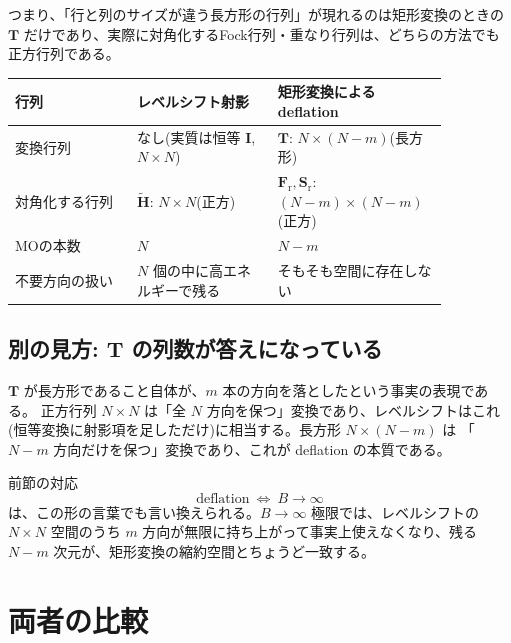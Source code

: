 \documentclass[uplatex,dvipdfmx,11pt]{jsarticle}
\newcommand{\Hcore}{\mathbf H}
\newcommand{\Tmat}{\mathbf T}
\newcommand{\Fr}{\mathbf F_{\mathrm r}}
\newcommand{\Sr}{\mathbf S_{\mathrm r}}
\begin{document}
つまり、「行と列のサイズが違う長方形の行列」が現れるのは矩形変換のときの
\(\Tmat\) だけであり、実際に対角化するFock行列・重なり行列は、どちらの方法でも
正方行列である。

\begin{center}
\begin{tabular}{|p{0.26\linewidth}|p{0.3\linewidth}|p{0.3\linewidth}|}
\hline
\textbf{行列} & \textbf{レベルシフト射影} & \textbf{矩形変換によるdeflation} \\
\hline
変換行列 & なし(実質は恒等 \(\mathbf I\), \(N\times N\)) &
\(\Tmat\): \(N\times(N-m)\)(長方形) \\
\hline
対角化する行列 & \(\widetilde{\Hcore}\): \(N\times N\)(正方) &
\(\Fr,\Sr\): \((N-m)\times(N-m)\)(正方) \\
\hline
MOの本数 & \(N\) & \(N-m\) \\
\hline
不要方向の扱い & \(N\) 個の中に高エネルギーで残る & そもそも空間に存在しない \\
\hline
\end{tabular}
\end{center}

\subsection{別の見方: \(\Tmat\) の列数が答えになっている}

\(\Tmat\) が長方形であること自体が、\(m\) 本の方向を落としたという事実の表現である。
正方行列 \(N\times N\) は「全 \(N\) 方向を保つ」変換であり、レベルシフトはこれ
(恒等変換に射影項を足しただけ)に相当する。長方形 \(N\times(N-m)\) は
「\(N-m\) 方向だけを保つ」変換であり、これが deflation の本質である。

前節の対応
\[
  \text{deflation}\ \Longleftrightarrow\ B\to\infty
\]
は、この形の言葉でも言い換えられる。\(B\to\infty\) 極限では、レベルシフトの
\(N\times N\) 空間のうち \(m\) 方向が無限に持ち上がって事実上使えなくなり、残る
\(N-m\) 次元が、矩形変換の縮約空間とちょうど一致する。

\section{両者の比較}
\end{document}
